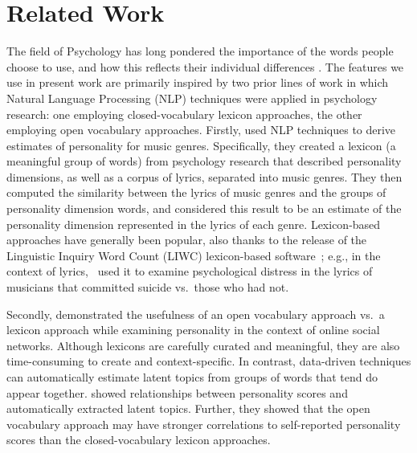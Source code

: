 \documentclass{article}
\begin{document}
\section{Related Work}\label{sec:relatedworks}
The field of Psychology has long pondered the importance of the words people choose to use, and how this reflects their individual differences \cite{tausczik2010psychological}.
The features we use in present work are primarily inspired by two prior lines of work in which Natural Language Processing (NLP) techniques were applied in psychology research: one employing closed-vocabulary lexicon approaches, the other employing open vocabulary approaches. Firstly, \cite{neuman2016personality} used NLP techniques to derive estimates of personality for music genres. Specifically, they created a lexicon (a meaningful group of words) from psychology research that described personality dimensions, as well as a corpus of lyrics, separated into music genres.  They then computed the similarity between the lyrics of music genres and the groups of personality dimension words, and considered this result to be an estimate of the personality dimension represented in the lyrics of each genre. Lexicon-based approaches have generally been popular, also thanks to the release of the Linguistic Inquiry Word Count (LIWC) lexicon-based software~\cite{pennebaker2015development}; e.g., in the context of lyrics,~\cite{markowitz201727} used it to examine psychological distress in the lyrics of musicians that committed suicide vs.\ those who had not. 

Secondly, \cite{schwartz2013personality} demonstrated the usefulness of an open vocabulary approach vs.\ a lexicon approach while examining personality in the context of online social networks. Although lexicons are carefully curated and meaningful, they are also time-consuming to create and context-specific. In contrast, data-driven techniques can automatically estimate latent topics from groups of words that tend do appear together. \cite{schwartz2013personality} showed relationships between personality scores and automatically extracted latent topics. Further, they showed that the open vocabulary approach may have stronger correlations to self-reported personality scores than the closed-vocabulary lexicon approaches. 
\end{document}
